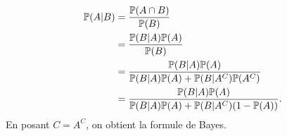 {\begin{nntd-sol}[]
\begin{enumerate}
\begin{equation*}
                \begin{aligned}
                    \mathbb{P}(A|B)
                    &=\frac{\mathbb{P}(A\cap B)}{\mathbb{P}(B)}\\
                    &=\frac{\mathbb{P}(B|A)\mathbb{P}(A)}{\mathbb{P}(B)}\\
                    &=\frac{\mathbb{P}(B|A)\mathbb{P}(A)}{\mathbb{P}(B|A)\mathbb{P}(A)+\mathbb{P}(B|A^C)\mathbb{P}(A^C)}\\
                    &=\frac{\mathbb{P}(B|A)\mathbb{P}(A)}{\mathbb{P}(B|A)\mathbb{P}(A)+\mathbb{P}(B|A^C)(1-\mathbb{P}(A))}.
                \end{aligned}
            \end{equation*}
            En posant \(C=A^C\), on obtient la formule de Bayes.
        \end{enumerate}
    \end{nntd-sol}
}{}

